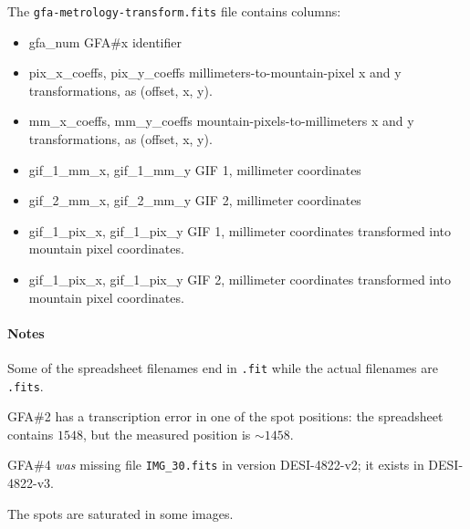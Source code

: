 \documentclass[10pt]{article}
\newcommand{\code}[1]{\texttt{#1}}
\begin{document}
The \code{gfa-metrology-transform.fits} file contains columns:
\begin{itemize}
\item{gfa\_num} GFA\#x identifier
\item{pix\_x\_coeffs, pix\_y\_coeffs} millimeters-to-mountain-pixel x and y transformations, as (offset, x, y).
\item{mm\_x\_coeffs, mm\_y\_coeffs} mountain-pixels-to-millimeters x and y transformations, as (offset, x, y).
\item{gif\_1\_mm\_x, gif\_1\_mm\_y} GIF 1, millimeter coordinates
\item{gif\_2\_mm\_x, gif\_2\_mm\_y} GIF 2, millimeter coordinates
\item{gif\_1\_pix\_x, gif\_1\_pix\_y} GIF 1, millimeter coordinates transformed
  into mountain pixel coordinates.
\item{gif\_1\_pix\_x, gif\_1\_pix\_y} GIF 2, millimeter coordinates transformed
  into mountain pixel coordinates.
\end{itemize}


\paragraph{Notes}

Some of the spreadsheet filenames end in \code{.fit} while the actual
filenames are \code{.fits}.

GFA\#2 has a transcription error in one of the spot positions: the
spreadsheet contains $1548$, but the measured position is $\sim 1458$.

GFA\#4 \emph{was} missing file \code{IMG\_30.fits} in version
DESI-4822-v2; it exists in DESI-4822-v3.

The spots are saturated in some images.
\end{document}
